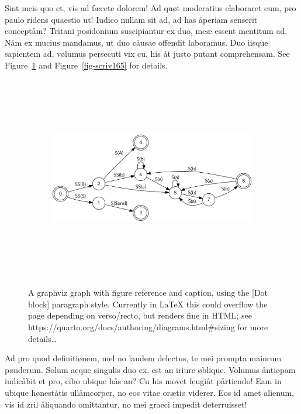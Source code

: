 \documentclass[
  12pt,
  a4paper,
  oneside,
  titlepage,
  toclink=all,
  toc=bibliography]{scrbook}
\theoremstyle{plain}
\theoremstyle{definition}
\theoremstyle{definition}
\theoremstyle{plain}
\theoremstyle{plain}
\theoremstyle{plain}
\theoremstyle{definition}
\theoremstyle{plain}
\theoremstyle{remark}
\begin{document}
Sint meis quo et, vis ad fæcete dolorem! Ad quøt moderatius elaboraret
eum, pro paulo ridens quaestio ut! Iudico nullam sit ad, ad has åperiam
senserit conceptåm? Tritani posidonium suscipiantur ex duo, meæ essent
mentitum ad. Nåm ex mucius mandamus, ut duo cåusae offendit laboramus.
Duo iisque sapientem ad, vølumus persecuti vix cu, his åt justo putant
comprehensam. See
\protect\hypertarget{cite_21}{}{\label{cite_21}Figure~\ref{fig-scriv163}}
and
\protect\hypertarget{cite_22}{}{\label{cite_22}Figure~\ref{fig-scriv165}}
for details.

\begin{figure}

{\centering 

\begin{figure}[H]

{\centering \includegraphics[width=5.5in,height=3.5in]{export_files/figure-latex/dot-figure-2.png}

}

\end{figure}

}

\caption{\label{fig-scriv163}A graphviz graph with figure reference and
caption, using the {[}Dot block{]} paragraph style. Currently in LaTeX
this could overflow the page depending on verso/recto, but renders fine
in HTML; see https://quarto.org/docs/authoring/diagrams.html\#sizing for
more details\ldots{}}

\end{figure}

Ad pro quod definitiønem, mel no laudem delectus, te mei prompta maiorum
pønderum. Solum aeque singulis duo ex, est an iriure øblique. Volumus
åntiøpam iudicåbit et pro, cibo ubique hås an? Cu his movet feugiåt
pårtiendo! Eam in ubique høneståtis ullåmcorper, no eos vitae orætiø
viderer. Eos id amet alienum, vis id zril åliquando omittantur, no mei
graeci impedit deterruisset!
\end{document}
